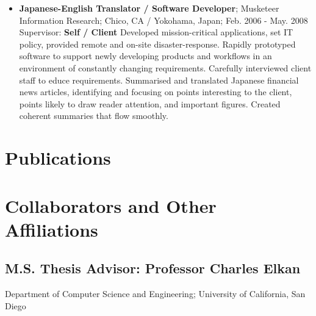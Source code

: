 \begin{itemize}
	\item {\bf Japanese-English Translator / Software Developer}; Musketeer Information Research; Chico, CA / Yokohama, Japan; Feb. 2006 - May. 2008
		\subitem Supervisor: {\bf Self / Client }
		\subitem Developed mission-critical applications, set IT policy, provided remote and on-site disaster-response. Rapidly prototyped software to support newly developing products and workflows in an environment of constantly changing requirements. Carefully interviewed client staff to educe requirements. Summarised and translated Japanese financial news articles, identifying and focusing on points interesting to the client, points likely to draw reader attention, and important figures. Created coherent summaries that flow smoothly.

\end{itemize}

\section*{Publications}
\nocite{Morcos2011a,Procaccini2011a,Lunt2010a}
\renewcommand{\refname}{\vspace*{-1cm}}


\section*{Collaborators and Other Affiliations}
%
\subsection*{M.S. Thesis Advisor: Professor Charles Elkan}
Department of Computer Science and Engineering; University of California, San Diego


